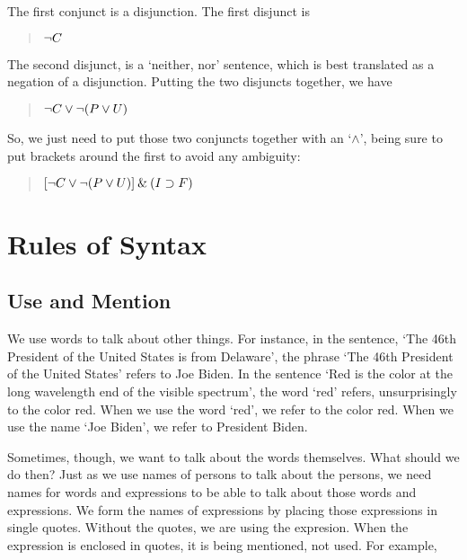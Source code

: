 \documentclass[../logic-text.tex]{subfiles}
\begin{document}
The first conjunct is a disjunction. The first disjunct is

\begin{quote}
\(\neg C\)
\end{quote}

The second disjunct, is a \enquote*{neither, nor} sentence, which is best translated as a negation of a disjunction. Putting the two disjuncts together, we have


\begin{quote}
  \(\neg C \lor \neg (P \lor U)\)
\end{quote}

So, we just need to put those two conjuncts together with an \enquote*{\(\land\)}, being sure to put brackets around the first to avoid any ambiguity:

\begin{quote}
\( [\neg C \lor \neg (P \lor U)] \mathbin{\&} (I \supset F)\)

\end{quote}

\section{Rules of Syntax}
\label{sec:rules-syntax}



\subsection{Use and Mention}
\label{sec:use-mention}

We use words to talk about other things. For instance, in the sentence, \enquote*{The 46th President of the United States is from Delaware}, the phrase \enquote*{The 46th President of the United States} refers to Joe Biden. In the sentence \enquote*{Red is the color at the long wavelength end of the visible spectrum}, the word \enquote*{red} refers, unsurprisingly to the color red. When we use the word \enquote*{red}, we refer to the color red. When we use the name \enquote*{Joe Biden}, we refer to President Biden.

Sometimes, though, we want to talk about the words themselves. What should we do then? Just as we use names of persons to talk about the persons, we need names for words and expressions to be able to talk about those words and expressions. 
We form the names of expressions by placing those expressions in single quotes. Without the quotes, we are using the expresion. When the expression is enclosed in quotes, it is being mentioned, not used. For example,
\end{document}
